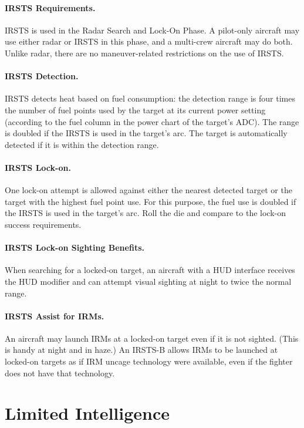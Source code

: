 \begin{advancedrules}
{\paragraph{IRSTS Requirements.}  IRSTS is used in the Radar Search and Lock-On Phase. A pilot-only aircraft may use either radar or IRSTS in this phase, and a multi-crew aircraft may do both. Unlike radar, there are no maneuver-related restrictions on the use of IRSTS.

\paragraph{IRSTS Detection.} IRSTS detects heat based on fuel consumption: the detection range is four times the number of fuel points used by the target at its current power setting (according to the fuel column in the power chart of the target’s ADC). The range is doubled if the IRSTS is used in the target’s  arc. The target is automatically detected if it is within the detection range.

\paragraph{IRSTS Lock-on.} One lock-on attempt is allowed against either the nearest detected target or the target with the highest fuel point use. For this purpose, the fuel use is doubled if the IRSTS is used in the target’s  arc. Roll the die and compare to the lock-on success requirements.

\paragraph{IRSTS Lock-on Sighting Benefits.} When searching for a locked-on target, an aircraft with a HUD interface receives the HUD modifier and can attempt visual sighting at night to twice the normal range.

\paragraph{IRSTS Assist for IRMs.} An aircraft may launch IRMs at a locked-on target even if it is not sighted. (This is handy at night and in haze.) An IRSTS-B allows IRMs to be launched at locked-on targets as if IRM uncage technology were available, even if the fighter does not have that technology.

}

\section{Limited Intelligence}
\label{rule:limited-intelligence}


\end{advancedrules}
